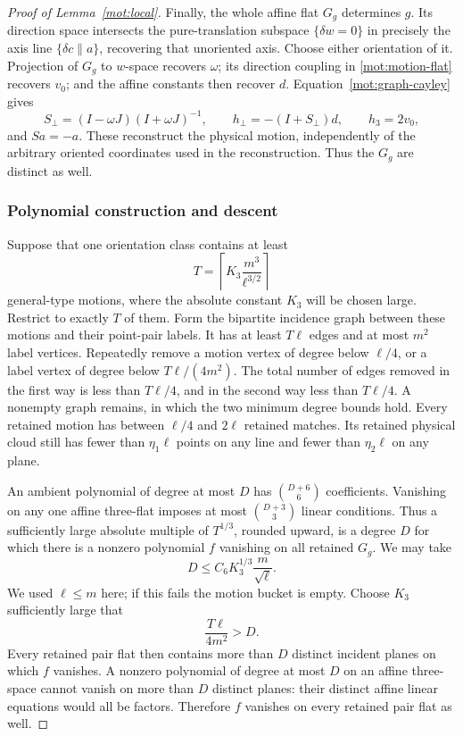 \begin{proof}[Proof of Lemma~\ref{mot:local}]
Finally, the whole affine flat \(G_g\) determines \(g\).  Its
direction space intersects the pure-translation subspace
\(\{\delta w=0\}\) in precisely the axis line
\(\{\delta c\parallel a\}\), recovering that unoriented axis.
Choose either orientation of it.  Projection of \(G_g\) to
\(w\)-space recovers \(\omega\); its direction coupling in
\eqref{mot:motion-flat} recovers \(v_0\); and the affine constants
then recover \(d\).  Equation~\eqref{mot:graph-cayley} gives
\[
 S_\perp=(I-\omega J)(I+\omega J)^{-1},\qquad
 h_\perp=-(I+S_\perp)d,\qquad h_3=2v_0,
\]
and \(Sa=-a\).  These reconstruct the physical motion, independently
of the arbitrary oriented coordinates used in the reconstruction.
Thus the \(G_g\) are distinct as well.

\subsubsection{Polynomial construction and descent}

Suppose that one orientation class contains at least
\[
 T=\left\lceil K_3\frac{m^3}{\ell^{3/2}}\right\rceil
\]
general-type motions, where the absolute constant \(K_3\) will be
chosen large.  Restrict to exactly \(T\) of them.  Form the
bipartite incidence graph between these motions and their point-pair
labels.  It has at least \(T\ell\) edges and at most \(m^2\)
label vertices.  Repeatedly remove a motion vertex of degree below
\(\ell/4\), or a label vertex of degree below
\(T\ell/(4m^2)\).  The total number of edges removed in the first
way is less than \(T\ell/4\), and in the second way less than
\(T\ell/4\).  A nonempty graph remains, in which the two minimum
degree bounds hold.  Every retained motion has between \(\ell/4\)
and \(2\ell\) retained matches.  Its retained physical cloud still
has fewer than \(\eta_1\ell\) points on any line and fewer than
\(\eta_2\ell\) on any plane.

An ambient polynomial of degree at most \(D\) has
\(\binom{D+6}{6}\) coefficients.  Vanishing on any one affine
three-flat imposes at most \(\binom{D+3}{3}\) linear conditions.
Thus a sufficiently large absolute multiple of \(T^{1/3}\),
rounded upward, is a degree \(D\) for which there is a nonzero
polynomial \(f\) vanishing on all retained \(G_g\).  We may take
\begin{equation}
\label{mot:degree-bound}
 D\le C_6K_3^{1/3}\frac{m}{\sqrt\ell}.
\end{equation}
We used \(\ell\le m\) here; if this fails the motion bucket is
empty.  Choose \(K_3\) sufficiently large that
\[
 \frac{T\ell}{4m^2}>D.
\]
Every retained pair flat then contains more than \(D\) distinct
incident planes on which \(f\) vanishes.  A nonzero polynomial of
degree at most \(D\) on an affine three-space cannot vanish on
more than \(D\) distinct planes: their distinct affine linear
equations would all be factors.  Therefore \(f\) vanishes on every
retained pair flat as well.


\end{proof}

